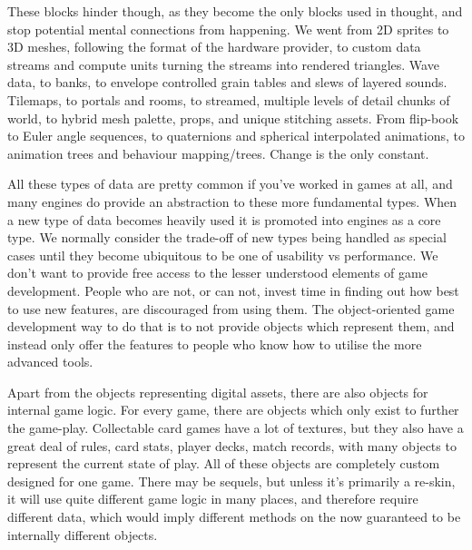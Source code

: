 \documentclass[a4paper,12pt]{book}
\begin{document}
These blocks hinder though, as they become the only blocks used in thought, and stop potential mental connections from happening.
We went from 2D sprites to 3D meshes, following the format of the hardware provider, to custom data streams and compute units turning the streams into rendered triangles.
Wave data, to banks, to envelope controlled grain tables and slews of layered sounds.
Tilemaps, to portals and rooms, to streamed, multiple levels of detail chunks of world, to hybrid mesh palette, props, and unique stitching assets.
From flip-book to Euler angle sequences, to quaternions and spherical interpolated animations, to animation trees and behaviour mapping/trees.
Change is the only constant.

All these types of data are pretty common if you've worked in games at all, and many engines do provide an abstraction to these more fundamental types.
When a new type of data becomes heavily used it is promoted into engines as a core type.
We normally consider the trade-off of new types being handled as special cases until they become ubiquitous to be one of usability vs performance.
We don't want to provide free access to the lesser understood elements of game development.
People who are not, or can not, invest time in finding out how best to use new features, are discouraged from using them.
The object-oriented game development way to do that is to not provide objects which represent them, and instead only offer the features to people who know how to utilise the more advanced tools.

Apart from the objects representing digital assets, there are also objects for internal game logic.
For every game, there are objects which only exist to further the game-play.
Collectable card games have a lot of textures, but they also have a great deal of rules, card stats, player decks, match records, with many objects to represent the current state of play.
All of these objects are completely custom designed for one game.
There may be sequels, but unless it's primarily a re-skin, it will use quite different game logic in many places, and therefore require different data, which would imply different methods on the now guaranteed to be internally different objects.
\end{document}
